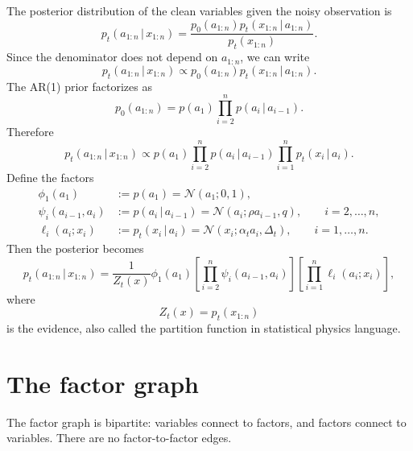 \documentclass[11pt]{article}
\newcommand{\N}{\mathcal{N}}
\newcommand{\given}{\,|\,}
\begin{document}
The posterior distribution of the clean variables given the noisy observation is
\begin{equation}
  p_t(a_{1:n}\given x_{1:n})
  = \frac{p_0(a_{1:n})p_t(x_{1:n}\given a_{1:n})}{p_t(x_{1:n})}.
\end{equation}
Since the denominator does not depend on \(a_{1:n}\), we can write
\begin{equation}
  p_t(a_{1:n}\given x_{1:n})
  \propto
  p_0(a_{1:n})p_t(x_{1:n}\given a_{1:n}).
\end{equation}
The AR(1) prior factorizes as
\begin{equation}
  p_0(a_{1:n})
  =p(a_1)\prod_{i=2}^n p(a_i\given a_{i-1}).
\end{equation}
Therefore
\begin{equation}
  p_t(a_{1:n}\given x_{1:n})
  \propto
  p(a_1)
  \prod_{i=2}^n p(a_i\given a_{i-1})
  \prod_{i=1}^n p_t(x_i\given a_i).
\end{equation}
Define the factors
\begin{align}
  \phi_1(a_1) &:= p(a_1)=\N(a_1;0,1), \\
  \psi_i(a_{i-1},a_i) &:= p(a_i\given a_{i-1})
  =\N(a_i;\rho a_{i-1},q), \qquad i=2,\ldots,n, \\
  \ell_i(a_i;x_i) &:= p_t(x_i\given a_i)=\N(x_i;\alpha_t a_i,\Delta_t),
  \qquad i=1,\ldots,n.
\end{align}
Then the posterior becomes
\begin{equation}
  p_t(a_{1:n}\given x_{1:n})
  =\frac{1}{Z_t(x)}
  \phi_1(a_1)
  \left[\prod_{i=2}^n \psi_i(a_{i-1},a_i)\right]
  \left[\prod_{i=1}^n \ell_i(a_i;x_i)\right],
  \label{eq:posterior-factorization}
\end{equation}
where
\begin{equation}
  Z_t(x)=p_t(x_{1:n})
\end{equation}
is the evidence, also called the partition function in statistical physics language.

\section{The factor graph}

The factor graph is bipartite: variables connect to factors, and factors connect to variables. There are no factor-to-factor edges.
\end{document}
